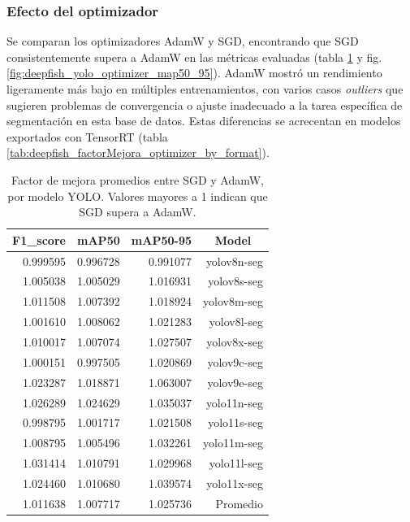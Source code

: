 \subsubsection{Efecto del optimizador}
Se comparan los optimizadores AdamW y SGD, encontrando que SGD consistentemente supera a AdamW en las métricas evaluadas (tabla \ref{tab:deepfish_factorMejora_optimizer_by_model} y fig. \ref{fig:deepfish_yolo_optimizer_map50_95}). AdamW mostró un rendimiento ligeramente más bajo en múltiples entrenamientos, con varios casos \textit{outliers} que sugieren problemas de convergencia o ajuste inadecuado a la tarea específica de segmentación en esta base de datos. Estas diferencias se acrecentan en modelos exportados con TensorRT (tabla \ref{tab:deepfish_factorMejora_optimizer_by_format}).

\begin{table}[htbp]
\centering
\caption[Factor de mejora entre SGD y AdamW en Deepfish, por modelo]{Factor de mejora promedios entre SGD y AdamW, por modelo YOLO. Valores mayores a 1 indican que SGD supera a AdamW.}
\label{tab:deepfish_factorMejora_optimizer_by_model}
\begin{tabular}{|r|r|r|r|}
\hline
\multicolumn{1}{|c|}{\textbf{F1\_score}} & \multicolumn{1}{c|}{\textbf{mAP50}} & \multicolumn{1}{c|}{\textbf{mAP50-95}} & \multicolumn{1}{c|}{\textbf{Model}} \\ \hline
0.999595 & 0.996728 & 0.991077 & yolov8n-seg \\ \hline
1.005038 & 1.005029 & 1.016931 & yolov8s-seg \\ \hline
1.011508 & 1.007392 & 1.018924 & yolov8m-seg \\ \hline
1.001610 & 1.008062 & 1.021283 & yolov8l-seg \\ \hline
1.010017 & 1.007074 & 1.027507 & yolov8x-seg \\ \hline
1.000151 & 0.997505 & 1.020869 & yolov9c-seg \\ \hline
1.023287 & 1.018871 & 1.063007 & yolov9e-seg \\ \hline
1.026289 & 1.024629 & 1.035037 & yolo11n-seg \\ \hline
0.998795 & 1.001717 & 1.021508 & yolo11s-seg \\ \hline
1.008795 & 1.005496 & 1.032261 & yolo11m-seg \\ \hline
1.031414 & 1.010791 & 1.029968 & yolo11l-seg \\ \hline
1.024460 & 1.010680 & 1.039574 & yolo11x-seg \\ \hline
1.011638 & 1.007717 & 1.025736 & Promedio \\ \hline
\end{tabular}
\end{table}

